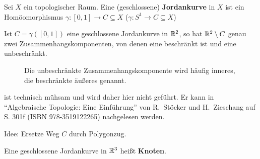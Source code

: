     

\begin{definition}
    Sei $X$ ein topologischer Raum. Eine (geschlossene)
    \textbf{Jordankurve} in $X$ ist ein Homöomorphismus 
    $\gamma: [0, 1] \rightarrow C \subseteq X$
    ($\gamma: S^1 \rightarrow C \subseteq X$)
\end{definition}

\begin{satz}
    Ist $C=\gamma([0,1])$ eine geschlossene Jordankurve in $\mathbb{R}^2$,
    so hat $\mathbb{R}^2 \setminus C$ genau zwei Zusammenhangskomponenten,
    von denen eine beschränkt ist und eine unbeschränkt.
\end{satz}

\begin{figure}[htp]
    \centering
     
    \label{fig:jordan-kurvensatz}
    \caption{Die unbeschränkte Zusammenhangskomponente wird häufig inneres, die beschränkte äußeres genannt.}
\end{figure}

\begin{beweis}
    ist technisch mühsam und wird daher hier nicht geführt. Er kann
    in \enquote{Algebraische Topologie: Eine Einführung} von R.~Stöcker
    und H.~Zieschang auf S. 301f (ISBN 978-3519122265) nachgelesen werden.

    Idee: Ersetze Weg $C$ durch Polygonzug.
\end{beweis}

\begin{definition}
    Eine geschlossene Jordankurve in $\mathbb{R}^3$ heißt \textbf{Knoten}.
\end{definition}

